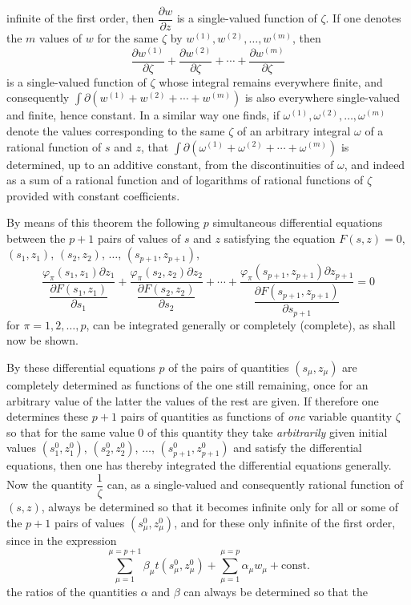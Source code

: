 \documentclass{article}
\begin{document}
infinite of the first order, then $\dfrac{\partial w}{\partial z}$ is a single-valued function of $\zeta$. If one denotes the $m$ values of $w$ for the same $\zeta$ by $w^{(1)}, w^{(2)}, \ldots, w^{(m)}$, then
\[ \frac{\partial w^{(1)}}{\partial\zeta} + \frac{\partial w^{(2)}}{\partial\zeta} + \cdots + \frac{\partial w^{(m)}}{\partial\zeta} \]
is a single-valued function of $\zeta$ whose integral remains everywhere finite, and consequently $\displaystyle\int \partial (w^{(1)} + w^{(2)} + \cdots + w^{(m)})$ is also everywhere single-valued and finite, hence constant. In a similar way one finds, if $\omega^{(1)}, \omega^{(2)}, \ldots, \omega^{(m)}$ denote the values corresponding to the same $\zeta$ of an arbitrary integral $\omega$ of a rational function of $s$ and $z$, that $\displaystyle\int \partial (\omega^{(1)} + \omega^{(2)} + \cdots + \omega^{(m)})$ is determined, up to an additive constant, from the discontinuities of $\omega$, and indeed as a sum of a rational function and of logarithms of rational functions of $\zeta$ provided with constant coefficients.

By means of this theorem the following $p$ simultaneous differential equations between the $p+1$ pairs of values of $s$ and $z$ satisfying the equation $F(s, z) = 0$, $(s_{1}, z_{1})$, $(s_{2}, z_{2})$, $\ldots$, $(s_{p+1}, z_{p+1})$,
\[ \frac{\varphi_{\pi}(s_{1}, z_{1}) \partial z_{1}}{\dfrac{\partial F(s_{1}, z_{1})}{\partial s_{1}}} + \frac{\varphi_{\pi}(s_{2}, z_{2}) \partial z_{2}}{\dfrac{\partial F(s_{2}, z_{2})}{\partial s_{2}}} + \cdots + \frac{\varphi_{\pi}(s_{p+1}, z_{p+1}) \partial z_{p+1}}{\dfrac{\partial F(s_{p+1}, z_{p+1})}{\partial s_{p+1}}} = 0 \]
for $\pi = 1, 2, \ldots, p$, can be integrated generally or completely (complete), as shall now be shown.

By these differential equations $p$ of the pairs of quantities $(s_{\mu}, z_{\mu})$ are completely determined as functions of the one still remaining, once for an arbitrary value of the latter the values of the rest are given. If therefore one determines these $p+1$ pairs of quantities as functions of \emph{one} variable quantity $\zeta$ so that for the same value 0 of this quantity they take \emph{arbitrarily} given initial values $(s_{1}^{0}, z_{1}^{0})$, $(s_{2}^{0}, z_{2}^{0})$, $\ldots$, $(s_{p+1}^{0}, z_{p+1}^{0})$ and satisfy the differential equations, then one has thereby integrated the differential equations generally. Now the quantity $\dfrac{1}{\zeta}$ can, as a single-valued and consequently rational function of $(s, z)$, always be determined so that it becomes infinite only for all or some of the $p+1$ pairs of values $(s_{\mu}^{0}, z_{\mu}^{0})$, and for these only infinite of the first order, since in the expression
\[ \sum_{\mu=1}^{\mu=p+1} \beta_{\mu} t(s_{\mu}^{0}, z_{\mu}^{0}) + \sum_{\mu=1}^{\mu=p} \alpha_{\mu} w_{\mu} + \text{const.} \]
the ratios of the quantities $\alpha$ and $\beta$ can always be determined so that the
\end{document}
